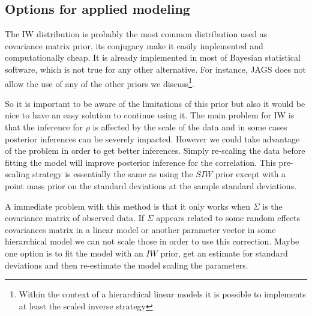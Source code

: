 \documentclass[a4paper]{article}
\newcommand{\matt}[1]{\textcolor{red}{(matt: #1)}}
\begin{document}
\subsection{Options for applied modeling}

The IW distribution is probably the most common distribution used as covariance matrix prior, its conjugacy make it easily implemented and computationally cheap. It is already implemented in most of Bayesian statistical software, which is not true for any other alternative. For instance, JAGS does not allow the use of any of the other priors we discuss\footnote{Within the context of a hierarchical linear models it is possible to implements at least the scaled inverse strategy}.  

So it is important to be aware of the limitations of this prior but also it would be nice to have an easy solution to continue using it. The main problem for IW is that the inference for $\rho$ is affected by the scale of the data and in some cases posterior inferences can be severely impacted. However we could take advantage of the problem in order to get better inferences. Simply re-scaling the data before fitting the model will improve posterior inference for the correlation. This pre-scaling strategy is essentially the same as using the $SIW$ prior except with a point mass prior on the standard deviations at the sample standard deviations.

A immediate problem with this method is that it only works when $\Sigma$ is the covariance matrix of observed data. If $\Sigma$ appears related to some random effects covariances matrix in a linear model or another parameter vector in some hierarchical model we can not scale those in order to use this correction.  Maybe one option is to fit the model with an $IW$ prior, get an estimate for standard deviations and then re-estimate the model scaling the parameters. %
\end{document}
